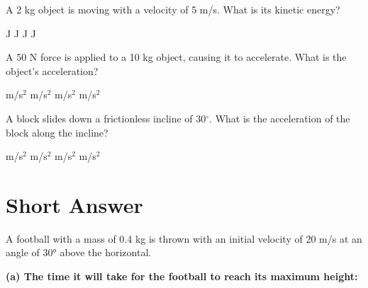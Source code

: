 \documentclass[addpoints]{exam}
\begin{document}
\begin{questions}
\question[1] A 2 kg object is moving with a velocity of 5 m/s. What is its kinetic energy?
\begin{choices}
     J
     J
     J
     J
\end{choices}

\question[1] A 50 N force is applied to a 10 kg object, causing it to accelerate. What is the object's acceleration?
\begin{choices}
     m/s$^2$
     m/s$^2$
     m/s$^2$
     m/s$^2$
\end{choices}

\question[1] A block slides down a frictionless incline of 30$^\circ$. What is the acceleration of the block along the incline?
\begin{choices}
     m/s$^2$
     m/s$^2$
     m/s$^2$
     m/s$^2$
\end{choices}




\section*{Short Answer}

\question A football with a mass of 0.4 kg is thrown with an initial velocity of 20 m/s at an angle of 30° above the horizontal.
\begin{solution}[5cm]
\textbf{(a) The time it will take for the football to reach its maximum height:}


\end{solution}
\end{questions}
\end{document}
